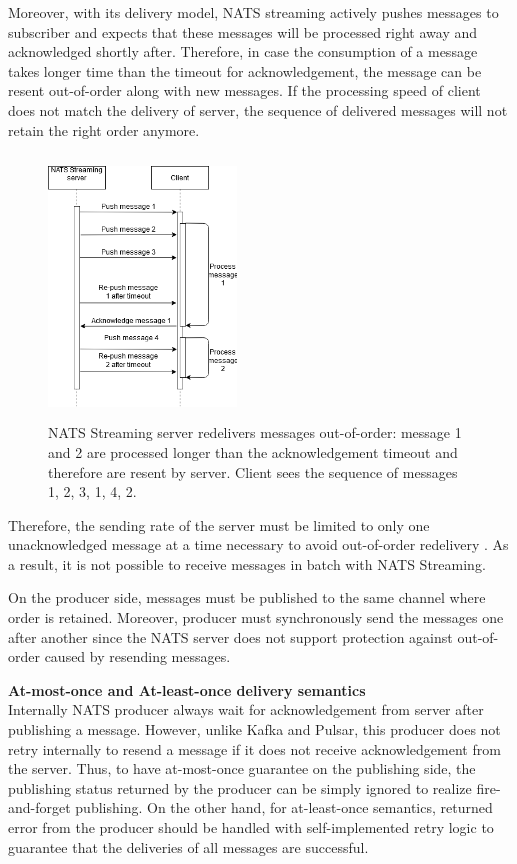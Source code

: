 Moreover, with its delivery model, NATS streaming actively pushes messages to subscriber and expects that these messages will be processed right away and acknowledged shortly after. Therefore, in case the consumption of a message takes longer time than the timeout for acknowledgement, the message can be resent out-of-order along with new messages. If the processing speed of client does not match the delivery of server, the sequence of delivered messages will not retain the right order anymore.
\begin{figure}[h]
	\centering
	\includegraphics[width=5cm,height=7cm]{images/order-nats.png}
	\caption{NATS Streaming server redelivers messages out-of-order: message 1 and 2 are processed longer than the acknowledgement timeout and therefore are resent by server. Client sees the sequence of messages 1, 2, 3, 1, 4, 2.}
	\label{fig:ordernats}
\end{figure}

Therefore, the sending rate of the server must be limited to only one unacknowledged message at a time necessary to avoid out-of-order redelivery \cite{natsinflight}. As a result, it is not possible to receive messages in batch with NATS Streaming. 

On the producer side, messages must be published to the same channel where order is retained. Moreover, producer must synchronously send the messages one after another since the NATS server does not support protection against out-of-order caused by resending messages.  

\textbf{At-most-once and At-least-once delivery semantics}\\
Internally NATS producer always wait for acknowledgement from server after publishing a message. However, unlike Kafka and Pulsar, this producer does not retry internally to resend a message if it does not receive acknowledgement from the server. Thus, to have at-most-once guarantee on the publishing side, the publishing status returned by the producer can be simply ignored to realize fire-and-forget publishing. On the other hand, for at-least-once semantics, returned error from the producer should be handled with self-implemented retry logic to guarantee that the deliveries of all messages are successful.

